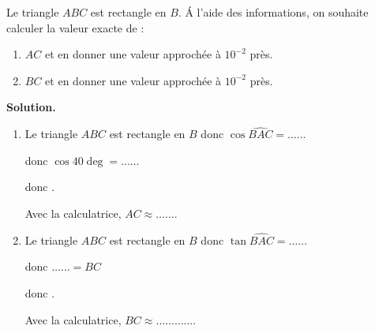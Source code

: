 \documentclass[openany]{book}
\begin{document}

\vspace{0.3cm}

\begin{minipage}{0.68\linewidth}
\begin{enonce}[eduscol4B]

Le triangle $ABC$ est rectangle en $B$. \'A l'aide des informations, on souhaite calculer la valeur exacte de :

\begin{enumerate}
\item $AC$ et en donner une valeur approchée à $10^{-2}$ près.
\item $BC$ et en donner une valeur approchée à $10^{-2}$ près.
\end{enumerate}

\end{enonce}

\textbf{Solution.}
\begin{enumerate}
\item Le triangle $ABC$ est rectangle en $B$ donc $\cos \widehat{BAC} = \ldots \ldots$ 

donc $\cos 40\deg =  \ldots \ldots$ 

donc . 

Avec la calculatrice, $AC \approx  \ldots \ldots$.
\item Le triangle $ABC$ est rectangle en $B$ donc $\tan \widehat{BAC} =  \ldots \ldots$ 

donc $ \ldots \ldots = BC$ 

donc . 

Avec la calculatrice, $BC \approx  \ldots \ldots \ldots \ldots$.
\end{enumerate}


\end{minipage}
\hfill
\end{document}
